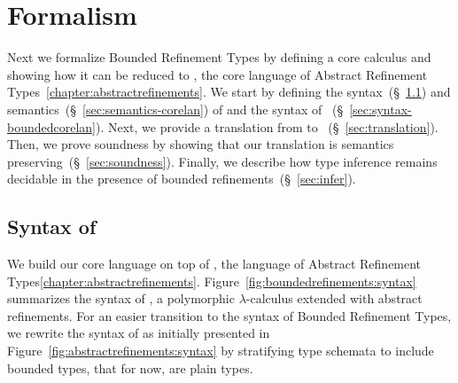 \section{Formalism}\label{sec:check}

Next we formalize Bounded Refinement Types by defining
a core calculus \boundedcorelan and showing how it can
be reduced to \corelan, the core language of Abstract
Refinement Types~\ref{chapter:abstractrefinements}.
%
We start by defining the syntax~(\S~\ref{sec:syntax-corelan})
and semantics~(\S~\ref{sec:semantics-corelan}) of \corelan
and the syntax of \boundedcorelan~(\S~\ref{sec:syntax-boundedcorelan}).
%
Next, we provide a translation from \boundedcorelan to
\corelan ~(\S~\ref{sec:translation}).
%
Then, we prove soundness by showing that our translation
is semantics preserving~(\S~\ref{sec:soundness}).
%
Finally, we describe how type inference remains
decidable in the presence of bounded refinements~(\S~\ref{sec:infer}).


\subsection{Syntax of \corelan}\label{sec:syntax-corelan}



We build our core language on top of \corelan, the language
of Abstract Refinement Types\ref{chapter:abstractrefinements}.
%
Figure~\ref{fig:boundedrefinements:syntax} summarizes the syntax of \corelan,
a polymorphic $\lambda$-calculus extended with abstract
refinements.
%
For an easier transition to the syntax of Bounded Refinement Types, 
we rewrite the syntax of \corelan as initially presented in Figure~\ref{fig:abstractrefinements:syntax}
by stratifying type schemata to include bounded types, that for now, 
are plain types.


